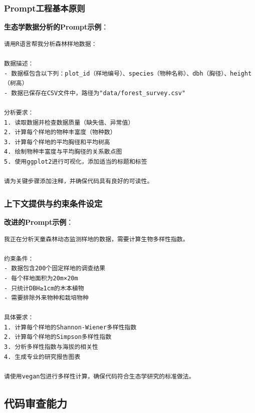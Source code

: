 \documentclass[
  twoside]{book}
\begin{document}
\hypertarget{promptux5de5ux7a0bux57faux672cux539fux5219}{%
\subsubsection{Prompt工程基本原则}\label{promptux5de5ux7a0bux57faux672cux539fux5219}}

\textbf{生态学数据分析的Prompt示例}：

\begin{verbatim}
请用R语言帮我分析森林样地数据：

数据描述：
- 数据框包含以下列：plot_id（样地编号）、species（物种名称）、dbh（胸径）、height（树高）
- 数据已保存在CSV文件中，路径为"data/forest_survey.csv"

分析要求：
1. 读取数据并检查数据质量（缺失值、异常值）
2. 计算每个样地的物种丰富度（物种数）
3. 计算每个样地的平均胸径和平均树高
4. 绘制物种丰富度与平均胸径的关系散点图
5. 使用ggplot2进行可视化，添加适当的标题和标签

请为关键步骤添加注释，并确保代码具有良好的可读性。
\end{verbatim}

\hypertarget{ux4e0aux4e0bux6587ux63d0ux4f9bux4e0eux7ea6ux675fux6761ux4ef6ux8bbeux5b9a}{%
\subsubsection{上下文提供与约束条件设定}\label{ux4e0aux4e0bux6587ux63d0ux4f9bux4e0eux7ea6ux675fux6761ux4ef6ux8bbeux5b9a}}

\textbf{改进的Prompt示例}：

\begin{verbatim}
我正在分析天童森林动态监测样地的数据，需要计算生物多样性指数。

约束条件：
- 数据包含200个固定样地的调查结果
- 每个样地面积为20m×20m
- 只统计DBH≥1cm的木本植物
- 需要排除外来物种和栽培物种

具体要求：
1. 计算每个样地的Shannon-Wiener多样性指数
2. 计算每个样地的Simpson多样性指数
3. 分析多样性指数与海拔的相关性
4. 生成专业的研究报告图表

请使用vegan包进行多样性计算，确保代码符合生态学研究的标准做法。
\end{verbatim}

\hypertarget{ux4ee3ux7801ux5ba1ux67e5ux80fdux529b}{%
\subsection{代码审查能力}\label{ux4ee3ux7801ux5ba1ux67e5ux80fdux529b}}
\end{document}
